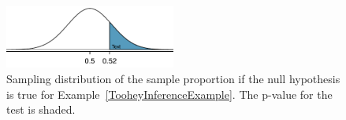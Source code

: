 \begin{figure}[h]
\centering
\includegraphics[width=0.5\textwidth]{ch_inference_for_props/figures/pValueForCampaignManagerClaimOfMoreThan50PercentSupport/pValueForCampaignManagerClaimOfMoreThan50PercentSupport}
\caption{Sampling distribution of the sample proportion if the null hypothesis is true for Example~\ref{TooheyInferenceExample}. The p-value for the test is shaded.}
\label{pValueForCampaignManagerClaimOfMoreThan50PercentSupport}
\end{figure}

